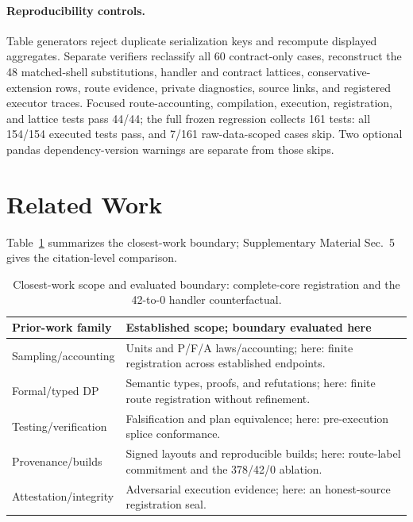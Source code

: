 \documentclass[letterpaper]{article}
\begin{document}
\paragraph{Reproducibility controls.}
Table generators reject duplicate serialization keys and recompute displayed
aggregates.  Separate verifiers reclassify all 60 contract-only cases,
reconstruct the 48 matched-shell substitutions, handler and contract lattices,
conservative-extension rows, route evidence, private diagnostics, source
links, and registered executor traces.  Focused route-accounting, compilation,
execution, registration, and lattice tests pass 44/44; the full frozen
regression collects 161 tests: all 154/154 executed tests pass, and 7/161
raw-data-scoped cases skip.
Two optional pandas dependency-version warnings are separate from those skips.

\section{Related Work}

Table~\ref{tab:v40-ownership} summarizes the closest-work boundary;
Supplementary Material Sec.~5 gives the citation-level comparison.

\begin{table}[t]
\centering
\small
\setlength{\tabcolsep}{4pt}
\begin{tabular}{@{}p{}p{}@{}}
\toprule
Prior-work family & Established scope; boundary evaluated here \\
\midrule
Sampling/accounting &
Units and P/F/A laws/accounting; here: finite registration across established
endpoints. \\
Formal/typed DP &
Semantic types, proofs, and refutations; here: finite route registration
without refinement. \\
Testing/verification &
Falsification and plan equivalence; here: pre-execution splice conformance. \\
Provenance/builds &
Signed layouts and reproducible builds; here: route-label commitment and the
378/42/0 ablation. \\
Attestation/integrity &
Adversarial execution evidence; here: an honest-source registration seal. \\
\bottomrule
\end{tabular}
\caption{Closest-work scope and evaluated boundary: complete-core registration and
the 42-to-0 handler counterfactual.}
\label{tab:v40-ownership}
\end{table}
\end{document}
